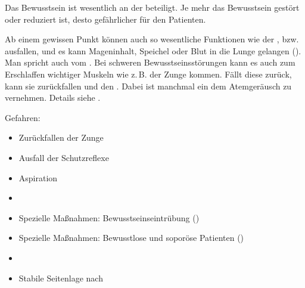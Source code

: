 {%
\label{topic:bewusstseinsstoerung-apam}%
Das Bewusstsein ist wesentlich an
der  beteiligt. Je mehr das
Bewusstsein gestört oder reduziert ist, desto gefährlicher für
den Patienten. 

Ab einem gewissen Punkt können auch so wesentliche
Funktionen wie der ,  bzw. 
ausfallen, und es kann Mageninhalt, Speichel oder Blut in
die Lunge gelangen (). Man spricht auch vom
.
Bei schweren Bewusstseinsstörungen kann es auch zum Erschlaffen
wichtiger Muskeln wie z.\,B. der Zunge kommen. Fällt
diese zurück, kann sie zurückfallen und den .
Dabei ist manchmal ein dem 
Atemgeräusch zu vernehmen.
Details siehe .
}{%
Gefahren:
\begin{itemize}
  \item Zurückfallen der Zunge
  \item Ausfall der Schutzreflexe
  \item Aspiration
  \item {}
\end{itemize}
}{}{}{}

\begin{Synopsis}
\end{Synopsis}








{%
\begin{itemize}
  \item Spezielle Maßnahmen: Bewusstseinseintrübung 
  ()
  \item Spezielle Maßnahmen: Bewusstlose und soporöse Patienten 
  ()
  \item \TxMassVit 
  \item Stabile Seitenlage nach 
\end{itemize}
}

